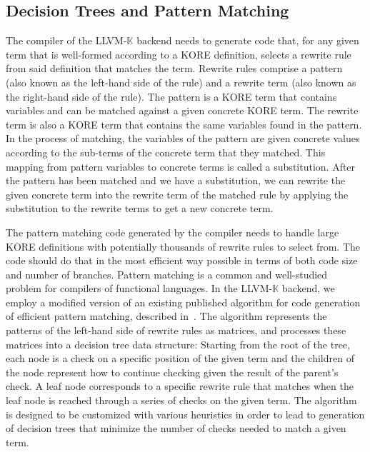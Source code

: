 \documentclass{article}
\theoremstyle{definition}
\newcommand{\K}{$\mathbb{K}$\xspace}
\newcommand{\KL}{LLVM-\K}
\begin{document}
\subsection{Decision Trees and Pattern Matching}
The compiler of the \KL backend needs to generate code that, for any given term that is well-formed according to a KORE definition, selects a rewrite rule from said definition that matches the term. Rewrite rules comprise a pattern (also known as the left-hand side of the rule) and a rewrite term (also known as the right-hand side of the rule). The pattern is a KORE term that contains variables and can be matched against a given concrete KORE term. The rewrite term is also a KORE term that contains the same variables found in the pattern. In the process of matching, the variables of the pattern are given concrete values according to the sub-terms of the concrete term that they matched. This mapping from pattern variables to concrete terms is called a substitution. After the pattern has been matched and we have a substitution, we can rewrite the given concrete term into the rewrite term of the matched rule by applying the substitution to the rewrite terms to get a new concrete term.

The pattern matching code generated by the compiler needs to handle large KORE definitions with potentially thousands of rewrite rules to select from. The code should do that in the most efficient way possible in terms of both code size and number of branches. Pattern matching is a common and well-studied problem for compilers of functional languages. In the \KL backend, we employ a modified version of an existing published algorithm for code generation of efficient pattern matching, described in~\cite{Maranget2008}. The algorithm represents the patterns of the left-hand side of rewrite rules as matrices, and processes these matrices into a decision tree data structure: Starting from the root of the tree, each node is a check on a specific position of the given term and the children of the node represent how to continue checking given the result of the parent’s check. A leaf node corresponds to a specific rewrite rule that matches when the leaf node is reached through a series of checks on the given term. The algorithm is designed to be customized with various heuristics in order to lead to generation of decision trees that minimize the number of checks needed to match a given term.
\end{document}
